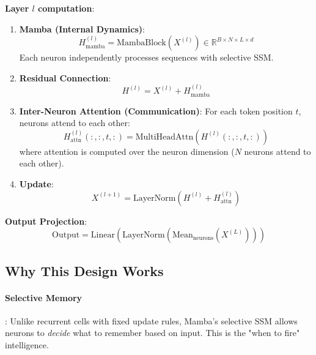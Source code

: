 \documentclass{article}
\begin{document}
\textbf{Layer $l$ computation}:
\begin{enumerate}
    \item \textbf{Mamba (Internal Dynamics)}:
    \begin{equation}
    H_{\text{mamba}}^{(l)} = \text{MambaBlock}(X^{(l)}) \in \mathbb{R}^{B \times N \times L \times d}
    \end{equation}
    Each neuron independently processes sequences with selective SSM.
    
    \item \textbf{Residual Connection}:
    \begin{equation}
    H^{(l)} = X^{(l)} + H_{\text{mamba}}^{(l)}
    \end{equation}
    
    \item \textbf{Inter-Neuron Attention (Communication)}:
    For each token position $t$, neurons attend to each other:
    \begin{equation}
    H_{\text{attn}}^{(l)}(:, :, t, :) = \text{MultiHeadAttn}\left(H^{(l)}(:, :, t, :)\right)
    \end{equation}
    where attention is computed over the neuron dimension ($N$ neurons attend to each other).
    
    \item \textbf{Update}:
    \begin{equation}
    X^{(l+1)} = \text{LayerNorm}(H^{(l)} + H_{\text{attn}}^{(l)})
    \end{equation}
\end{enumerate}

\textbf{Output Projection}:
\begin{equation}
\text{Output} = \text{Linear}\left(\text{LayerNorm}\left(\text{Mean}_{\text{neurons}}(X^{(L)})\right)\right)
\end{equation}

\subsection{Why This Design Works}

\paragraph{Selective Memory}: Unlike recurrent cells with fixed update rules, Mamba's selective SSM allows neurons to \emph{decide} what to remember based on input. This is the "when to fire" intelligence.
\end{document}
